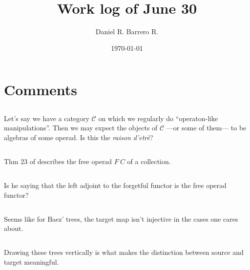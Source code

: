 \documentclass{amsart}
\title{Work log of June 30}
\author{Daniel R. Barrero R.}
\date{\today}
\begin{document}
\maketitle

\section{Comments}

\subsection{} Let's say we have a category $\mathcal{C}$ on which we
regularly do ``operaton-like manipulations''. Then we may expect the
objects of $\mathcal{C}$ ---or some of them--- to be algebras of some
operad. Is this the \emph{raison d'etrè}?

\subsection{} Thm 23 of \cite{baezOtter} describes the free operad $F \ C$
of a collection.

\subsection{} Is he saying that the left adjoint to the forgetful functor
is the free operad functor?

\subsection{} Seems like for Baez' trees, the target map isn't injective
in the cases one cares about.

\subsection{} Drawing these trees vertically is what makes the distinction
between source and target meaningful.




\end{document}
